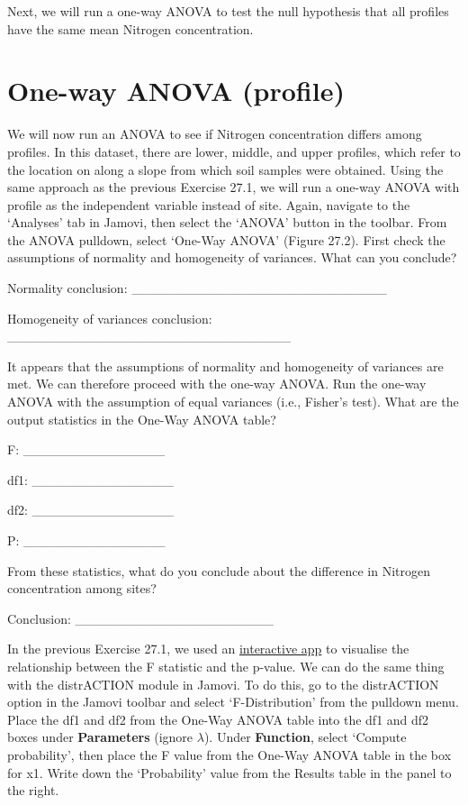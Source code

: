 \documentclass[
]{scrbook}
\begin{document}
Next, we will run a one-way ANOVA to test the null hypothesis that all profiles have the same mean Nitrogen concentration.

\hypertarget{one-way-anova-profile}{%
\section{One-way ANOVA (profile)}\label{one-way-anova-profile}}

We will now run an ANOVA to see if Nitrogen concentration differs among profiles.
In this dataset, there are lower, middle, and upper profiles, which refer to the location on along a slope from which soil samples were obtained.
Using the same approach as the previous Exercise 27.1, we will run a one-way ANOVA with profile as the independent variable instead of site.
Again, navigate to the `Analyses' tab in Jamovi, then select the `ANOVA' button in the toolbar.
From the ANOVA pulldown, select `One-Way ANOVA' (Figure 27.2).
First check the assumptions of normality and homogeneity of variances.
What can you conclude?

Normality conclusion: \_\_\_\_\_\_\_\_\_\_\_\_\_\_\_\_\_\_\_\_\_\_\_\_\_\_\_

Homogeneity of variances conclusion: \_\_\_\_\_\_\_\_\_\_\_\_\_\_\_\_\_\_\_\_\_\_\_\_\_\_\_\_\_\_

It appears that the assumptions of normality and homogeneity of variances are met.
We can therefore proceed with the one-way ANOVA.
Run the one-way ANOVA with the assumption of equal variances (i.e., Fisher's test).
What are the output statistics in the One-Way ANOVA table?

F: \_\_\_\_\_\_\_\_\_\_\_\_\_\_\_

df1: \_\_\_\_\_\_\_\_\_\_\_\_\_\_\_

df2: \_\_\_\_\_\_\_\_\_\_\_\_\_\_\_

P: \_\_\_\_\_\_\_\_\_\_\_\_\_\_\_

From these statistics, what do you conclude about the difference in Nitrogen concentration among sites?

Conclusion: \_\_\_\_\_\_\_\_\_\_\_\_\_\_\_\_\_\_\_\_\_

In the previous Exercise 27.1, we used an \href{https://bradduthie.shinyapps.io/f_distribution/}{interactive app} to visualise the relationship between the F statistic and the p-value.
We can do the same thing with the distrACTION module in Jamovi.
To do this, go to the distrACTION option in the Jamovi toolbar and select `F-Distribution' from the pulldown menu.
Place the df1 and df2 from the One-Way ANOVA table into the df1 and df2 boxes under \textbf{Parameters} (ignore \(\lambda\)).
Under \textbf{Function}, select `Compute probability', then place the F value from the One-Way ANOVA table in the box for x1.
Write down the `Probability' value from the Results table in the panel to the right.
\end{document}

